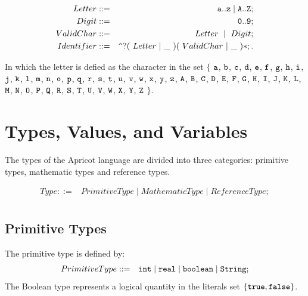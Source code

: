 \documentclass{WileySix}
\begin{document}
\begin{eqnarray*}
 Letter  &::=& {\tt a .. z \mid A .. Z} ;\\
 Digit  &::=& {\tt 0 .. 9};\\
 ValidChar  &::=&  Letter   ~\mid~  Digit ;\\
 Identifier  &::=& {\tt \verb!^!} ? (~Letter~|~{\tt \_}~) (~ValidChar~|~{\tt \_}~)*;.
\end{eqnarray*}


In which the letter is defied as the character in the set 
$\{$  ${\tt a}$, 
${\tt b}$, ${\tt c}$, ${\tt d}$, 
${\tt e}$, ${\tt f}$, ${\tt g}$, ${\tt h}$, 
${\tt i}$, ${\tt j}$, ${\tt k}$, ${\tt l}$, ${\tt m}$, 
${\tt n}$, ${\tt o}$, ${\tt p}$, ${\tt q}$, ${\tt r}$, 
${\tt s}$, ${\tt t}$, ${\tt u}$, ${\tt v}$, ${\tt w}$, 
${\tt x}$, ${\tt y}$, ${\tt z}$, ${\tt A}$, ${\tt B}$, 
${\tt C}$, ${\tt D}$, ${\tt E}$, ${\tt F}$, ${\tt G}$, 
${\tt H}$, ${\tt I}$, ${\tt J}$, ${\tt K}$, ${\tt L}$, 
${\tt M}$, ${\tt N}$, ${\tt O}$, ${\tt P}$, ${\tt Q}$, 
${\tt R}$, ${\tt S}$, ${\tt T}$, ${\tt U}$, ${\tt V}$, 
${\tt W}$, ${\tt X}$, ${\tt Y}$, ${\tt Z}$
$\}$.


\section{Types, Values, and Variables}
The types of the Apricot  language are divided into three categories: primitive types,
mathematic types and reference types. 

\begin{align*}
 Type ::= & PrimitiveType \mid MathematicType  \mid  ReferenceType ;\\
\end{align*}

\subsection{Primitive Types}


The primitive type is defined by:
\begin{eqnarray*}
 PrimitiveType &::=&  {\tt int} \mid {\tt real} \mid {\tt boolean} \mid {\tt String};\\
\end{eqnarray*}
The Boolean
type represents a logical quantity in the literals set $\{ {\tt true}, {\tt false}\}$.
\end{document}
